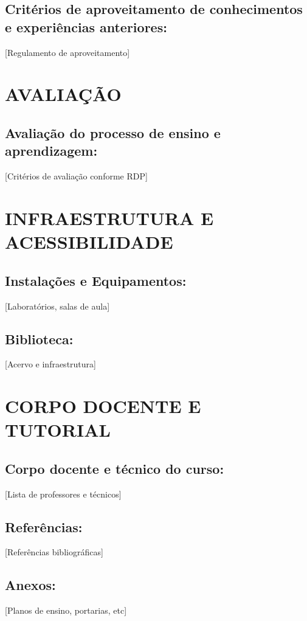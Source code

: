 \documentclass{ifsc-ppc}
\begin{document}
\subsection{Critérios de aproveitamento de conhecimentos e experiências anteriores:}
[Regulamento de aproveitamento]

\section{AVALIAÇÃO}
\subsection{Avaliação do processo de ensino e aprendizagem:}
[Critérios de avaliação conforme RDP]

\section{INFRAESTRUTURA E ACESSIBILIDADE}
\subsection{Instalações e Equipamentos:}
[Laboratórios, salas de aula]

\subsection{Biblioteca:}
[Acervo e infraestrutura]

\section{CORPO DOCENTE E TUTORIAL}
\subsection{Corpo docente e técnico do curso:}
[Lista de professores e técnicos]

\subsection{Referências:}
[Referências bibliográficas]

\subsection{Anexos:}
[Planos de ensino, portarias, etc]
\end{document}

